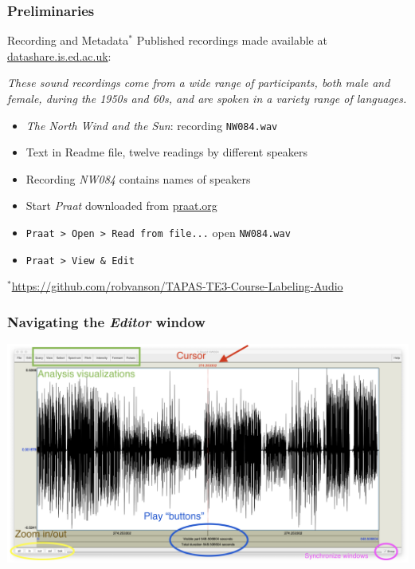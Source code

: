 \documentclass{beamer}
\begin{document}
\begin{frame} 
\frametitle{Preliminaries} 

\begin{block}{Recording and Metadata$^*$}
Published recordings made available at \href{https://datashare.is.ed.ac.uk/handle/10283/387}{datashare.is.ed.ac.uk}:

\textit{These sound recordings come from a wide range of participants, both male and female, during the 1950s and 60s, and are spoken in a variety range of languages.}
\end{block} 
\begin{itemize} 
\item \textit{The North Wind and the Sun}: recording \texttt{NW084.wav}
\item Text in Readme file, twelve readings by different speakers
\item Recording \textit{NW084} contains names of speakers
\item Start \textit{Praat} downloaded from \href{http://www.praat.org}{praat.org}
\item \texttt{Praat > Open > Read from file...} open \texttt{NW084.wav}
\item \texttt{Praat > View \& Edit}
\end{itemize}

\vskip 0.5cm
\scriptsize{$^*$\url{https://github.com/robvanson/TAPAS-TE3-Course-Labeling-Audio}}
\end{frame}

\begin{frame} 
\frametitle{Navigating the \textit{Editor} window} 

\includegraphics[width=1\framewidth]{img/Editor_Screenshot}

\end{frame}
\end{document}
